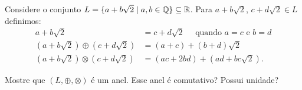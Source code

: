 \documentclass[12pt]{article}
\begin{document}
\vesp

\questao Considere o conjunto $L = \{ a + b\sqrt{2} \mid a, b \in \mathbb{Q}\} \subseteq \mathbb{R}$. Para $a + b\sqrt{2}$, $c + d\sqrt{2} \in L$ definimos:
\begin{align*}
	a + b\sqrt{2} &= c + d\sqrt{2} \quad \mbox{ quando } a = c \mbox{ e } b = d\\
	(a + b\sqrt{2}) \oplus (c + d\sqrt{2}) &= (a + c) + (b + d)\sqrt{2}\\
	(a + b\sqrt{2}) \otimes (c + d\sqrt{2}) &= (ac + 2bd) + (ad + bc\sqrt{2}).
\end{align*}

Mostre que $(L, \oplus, \otimes)$ é um anel. Esse anel é comutativo? Possui unidade?
\end{document}
